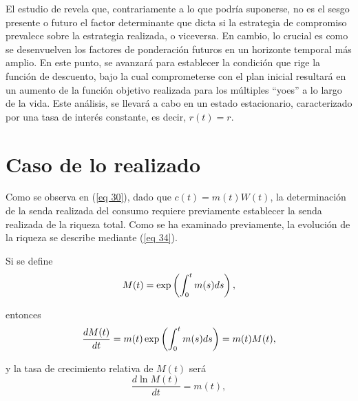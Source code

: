 El estudio de \parencite{feigenbaum2021deviation} revela que, contrariamente a lo que podría suponerse, no es el sesgo presente o futuro el factor determinante que dicta si la estrategia de compromiso prevalece sobre la estrategia realizada, o viceversa. En cambio, lo crucial es como se desenvuelven los factores de ponderación futuros en un horizonte temporal más amplio. En este punto, se avanzará para establecer la condición que rige la función de descuento, bajo la cual comprometerse con el plan inicial resultará en un aumento de la función objetivo realizada para los múltiples “yoes” a lo largo de la vida. Este análisis, se llevará a cabo en un estado estacionario, caracterizado por una tasa de interés constante, es decir, $r(t) = r$.

\section{Caso de lo realizado}
\label{Sección 3.1} 
Como se observa en (\ref{eq 30}), dado que $c(t) = m(t)W(t)$, la determinación de la senda realizada del consumo requiere previamente establecer la senda realizada de la riqueza total. Como se ha examinado previamente, la evolución de la riqueza se describe mediante (\ref{eq 34}).

Si se define 
\begin{equation}
\label{eq 47}
    M(t)= \exp \left( \displaystyle \int_0^t m(s) ds \right),
\end{equation}

\noindent entonces
$$\dfrac{d M(t)}{dt}= m(t) \exp\left( \displaystyle \int_0^t m(s) ds \right)=m(t) M(t),$$

\noindent y la tasa de crecimiento relativa de $M(t)$ será
\begin{equation}
\label{eq 48}
    \dfrac{d \ln M(t)}{dt}= m(t), 
\end{equation}

